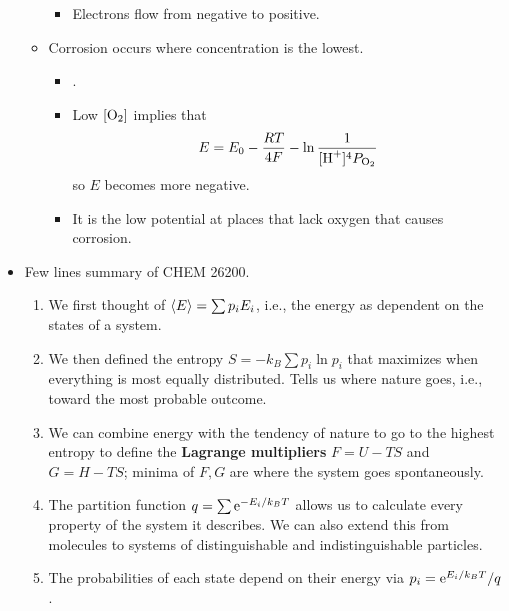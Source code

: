 \documentclass[../notes.tex]{subfiles}
\begin{document}
\begin{itemize}
\begin{itemize}
        \begin{itemize}
            \item Electrons flow from negative to positive.
        \end{itemize}
        \item Corrosion occurs where  concentration is the lowest.
        \begin{itemize}
            \item {}.
            \item Low $[\ce{O2}]$ implies that
            \begin{equation*}
                E = E_0-\frac{RT}{4F}-\ln\frac{1}{[\ce{H+}]^4P_{\ce{O2}}}
            \end{equation*}
            so $E$ becomes more negative.
            \item It is the low potential at places that lack oxygen that causes corrosion.
        \end{itemize}
    \end{itemize}
    \item Few lines summary of CHEM 26200.
    \begin{enumerate}
        \item We first thought of $\prb{E}=\sum p_iE_i$, i.e., the energy as dependent on the states of a system.
        \item We then defined the entropy $S=-k_B\sum p_i\ln p_i$ that maximizes when everything is most equally distributed. Tells us where nature goes, i.e., toward the most probable outcome.
        \item We can combine energy with the tendency of nature to go to the highest entropy to define the \textbf{Lagrange multipliers} $F=U-TS$ and $G=H-TS$; minima of $F,G$ are where the system goes spontaneously.
        \item The partition function $q=\sum\e[-E_i/k_BT]$ allows us to calculate every property of the system it describes. We can also extend this from molecules to systems of distinguishable and indistinguishable particles.
        \item The probabilities of each state depend on their energy via $p_i=\e[E_i/k_BT]/q$.
    \end{enumerate}
\end{itemize}
\end{document}
